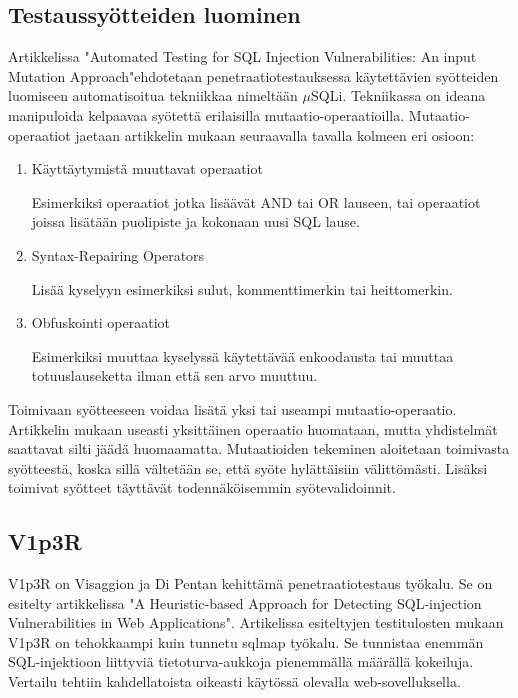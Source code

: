 \documentclass[finnish]{tktltiki2}
\theoremstyle{definition}
\theoremstyle{remark}
\begin{document}
	\subsection{Testaussyötteiden luominen}
	Artikkelissa "Automated Testing for SQL Injection Vulnerabilities: An input Mutation Approach"\cite{generation}\space ehdotetaan penetraatiotestauksessa käytettävien syötteiden luomiseen automatisoitua tekniikkaa nimeltään $\mu$SQLi. Tekniikassa on ideana manipuloida kelpaavaa syötettä erilaisilla mutaatio-operaatioilla. Mutaatio-operaatiot jaetaan artikkelin mukaan seuraavalla tavalla kolmeen eri osioon:
	\begin{enumerate}
	\item Käyttäytymistä muuttavat operaatiot
	
	Esimerkiksi operaatiot jotka lisäävät AND tai OR lauseen, tai operaatiot joissa lisätään puolipiste ja kokonaan uusi SQL lause. 
	
	\item Syntax-Repairing Operators
	
	Lisää kyselyyn esimerkiksi sulut, kommenttimerkin tai heittomerkin.
	
	\item Obfuskointi operaatiot
	
	Esimerkiksi muuttaa kyselyssä käytettävää enkoodausta tai muuttaa totuuslauseketta ilman että sen arvo muuttuu.
	\end{enumerate}
	
	Toimivaan syötteeseen voidaa lisätä yksi tai useampi mutaatio-operaatio. Artikkelin mukaan useasti yksittäinen operaatio huomataan, mutta yhdistelmät saattavat silti jäädä huomaamatta. Mutaatioiden tekeminen aloitetaan toimivasta syötteestä, koska sillä vältetään se, että syöte hylättäisiin välittömästi. Lisäksi toimivat syötteet täyttävät todennäköisemmin syötevalidoinnit. 
	
	\subsection{V1p3R}
	V1p3R on Visaggion ja Di Pentan kehittämä penetraatiotestaus työkalu. Se on esitelty artikkelissa "A Heuristic-based Approach for Detecting SQL-injection Vulnerabilities in Web Applications"\space\cite{viper}. Artikelissa esiteltyjen testitulosten mukaan V1p3R on tehokkaampi kuin tunnetu sqlmap työkalu. Se tunnistaa enemmän SQL-injektioon liittyviä tietoturva-aukkoja pienemmällä määrällä kokeiluja. Vertailu tehtiin kahdellatoista oikeasti käytössä olevalla web-sovelluksella.
	
\end{document}
